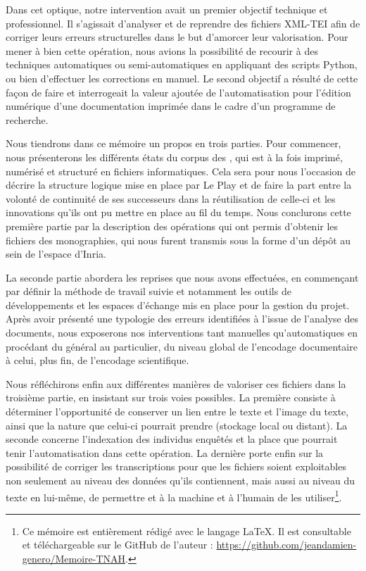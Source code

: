Dans cet optique, notre intervention avait un premier objectif technique et professionnel. Il s'agissait d'analyser et de reprendre des fichiers XML-TEI afin de corriger leurs erreurs structurelles dans le but d'amorcer leur valorisation. Pour mener à bien cette opération, nous avions la possibilité de recourir à des techniques automatiques ou semi-automatiques en appliquant des scripts Python, ou bien d'effectuer les corrections en manuel. Le second objectif a résulté de cette façon de faire et interrogeait la valeur ajoutée de l'automatisation pour l'édition numérique d'une documentation imprimée dans le cadre d'un programme de recherche.

Nous tiendrons dans ce mémoire un propos en trois parties. Pour commencer, nous présenterons les différents états du corpus des \odm{}, qui est à la fois imprimé, numérisé et structuré en fichiers informatiques. Cela sera pour nous l'occasion de décrire la structure logique mise en place par Le Play et de faire la part entre la volonté de continuité de ses successeurs dans la réutilisation de celle-ci et les innovations qu'ils ont pu mettre en place au fil du temps. Nous conclurons cette première partie par la description des opérations qui ont permis d'obtenir les fichiers des monographies, qui nous furent transmis sous la forme d'un dépôt au sein de l'espace \gitlab{} d'Inria.

La seconde partie abordera les reprises que nous avons effectuées, en commençant par définir la méthode de travail suivie et notamment les outils de développements et les espaces d'échange  mis en place pour la gestion du projet. Après avoir présenté une typologie des erreurs identifiées à l'issue de l'analyse des documents, nous exposerons nos interventions tant manuelles qu'automatiques en procédant du général au particulier, \cad{} du niveau global de l'encodage documentaire à celui, plus fin, de l'encodage scientifique.

Nous réfléchirons enfin aux différentes manières de valoriser ces fichiers dans la troisième partie, en insistant sur trois voies possibles. La première consiste à déterminer l'opportunité de conserver un lien entre le texte et l'image du texte, ainsi que la nature que celui-ci pourrait prendre (stockage local ou distant). La seconde concerne l'indexation des individus enquêtés et la place que pourrait tenir l'automatisation dans cette opération. La dernière porte enfin sur la possibilité de corriger les transcriptions pour que les fichiers soient exploitables non seulement au niveau des données qu'ils contiennent, mais aussi au niveau du texte en lui-même, \cad{} de permettre et à la machine et à l'humain de les utiliser\footnote{Ce mémoire est entièrement rédigé avec le langage \LaTeX. Il est consultable et téléchargeable sur le GitHub de l'auteur : \url{https://github.com/jeandamien-genero/Memoire-TNAH}.}.

